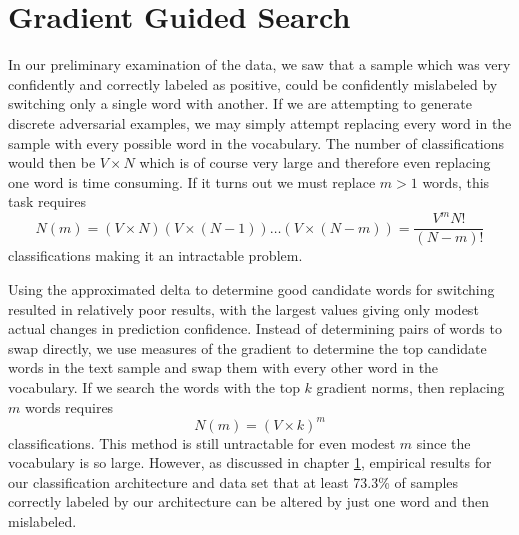 \chapter{Gradient Guided Search}
In our preliminary examination of the data, we saw that a sample which was very confidently and correctly labeled as positive, could be confidently mislabeled by switching only a single word with another.  If we are attempting to generate discrete adversarial examples, we may simply attempt replacing every word in the sample with every possible word in the vocabulary.  The number of classifications would then be $V\times N$ which is of course very large and therefore even replacing one word is time consuming.  If it turns out we must replace $m>1$ words, this task requires 
\begin{equation}
N(m) = (V\times N)(V\times (N-1))\dots(V\times (N-m)) = \frac{V^m N!}{(N-m)!}
\end{equation}
classifications making it an intractable problem.

Using the approximated delta to determine good candidate words for switching resulted in relatively poor results, with the largest values giving only modest actual changes in prediction confidence.  Instead of determining pairs of words to swap directly, we use measures of the gradient to determine the top candidate words in the text sample and swap them with every other word in the vocabulary.  If we search the words with the top $k$ gradient norms, then replacing $m$ words requires
\begin{equation}
N(m) = (V\times k)^m
\end{equation}
classifications.  This method is still untractable for even modest $m$ since the vocabulary is so large.  However, as discussed in chapter \ref{}, empirical results for our classification architecture and data set that at least 73.3\% of samples correctly labeled by our architecture can be altered by just one word and then mislabeled.
